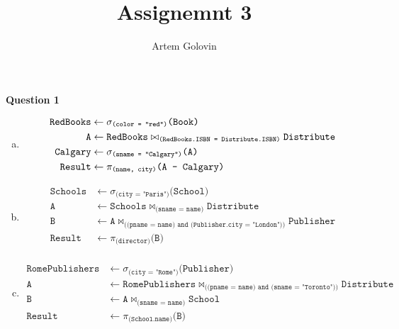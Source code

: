 \documentclass[11pt]{article}
\title{Assignemnt 3}
\author{Artem Golovin}
\def\code#1{\texttt{#1}}
\def\select#1#2{\sigma_{\code{(#1)}} \code{(#2)}}
\def\join#1#2#3{\code{#1} \bowtie_{\code{(#2)}} \code{#3}}
\def\proj#1#2{\pi_{\code{(#1)}} \code{(#2)}}
\def\diff#1#2{\code{#1} - \code{#2}}
\begin{document}
\maketitle

\item[] \textbf{Question 1}

  \begin{enumerate}[a.]
    \item
      \begin{equation*}
      \begin{aligned}
        \code{RedBooks} &\leftarrow \select{color = "red"}{Book} \\
        \code{A} &\leftarrow \join{RedBooks}{RedBooks.ISBN = Distribute.ISBN}{Distribute} \\
        \code{Calgary} &\leftarrow \select{sname = "Calgary"}{A} \\
        \code{Result} &\leftarrow \proj{name, city} {\diff{A}{Calgary}}
      \end{aligned}
      \end{equation*}

    \item
      \begin{equation*}
      \begin{aligned}
        \code{Schools} &\leftarrow \select{city = "Paris"}{School} \\
        \code{A} &\leftarrow \join{Schools}{sname = name}{Distribute} \\
        \code{B} &\leftarrow \join{A}{(pname = name) and (Publisher.city = "London")}{Publisher} \\
        \code{Result} &\leftarrow \proj{director}{B} \\
      \end{aligned}
      \end{equation*}

    \item 
      \begin{equation*}
      \begin{aligned}
        \code{RomePublishers} &\leftarrow \select{city = "Rome"}{Publisher} \\
        \code{A} &\leftarrow \join{RomePublishers}{(pname = name) and (sname = "Toronto")}{Distribute} \\ %
        \code{B} &\leftarrow \join{A}{sname = name}{School} \\ %
        \code{Result} &\leftarrow \proj{School.name}{B}
      \end{aligned}
      \end{equation*}


\end{enumerate}
\end{document}
